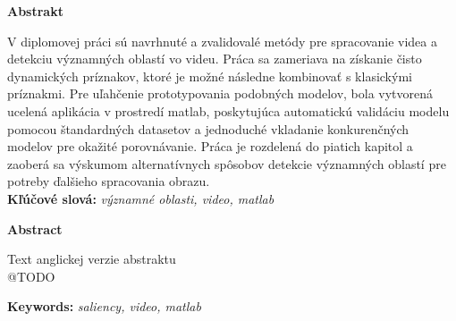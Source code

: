 {\noindent\large\bf Abstrakt}

\vspace{1.8cm}
V diplomovej práci sú navrhnuté a zvalidovalé metódy pre spracovanie videa a detekciu významných oblastí vo videu.
Práca sa zameriava na získanie čisto dynamických príznakov, ktoré je možné následne kombinovať s klasickými príznakmi.
Pre uľahčenie prototypovania podobných modelov, bola vytvorená ucelená aplikácia v prostredí matlab, poskytujúca automatickú validáciu modelu pomocou štandardných datasetov a jednoduché vkladanie konkurenčných modelov pre okažité porovnávanie. Práca je rozdelená do piatich kapitol a zaoberá sa výskumom alternatívnych spôsobov detekcie významných oblastí pre potreby ďalšieho spracovania obrazu.
\\

{\parindent0pt \textbf{Kľúčové slová:} \emph{významné oblasti, video, matlab}}

\newpage
 {\noindent\large\bf Abstract}
  \vspace{1.8cm}


Text anglickej verzie abstraktu
\\
@TODO

{\parindent0pt \textbf{Keywords:} \emph{saliency, video, matlab}}


\newpage	
